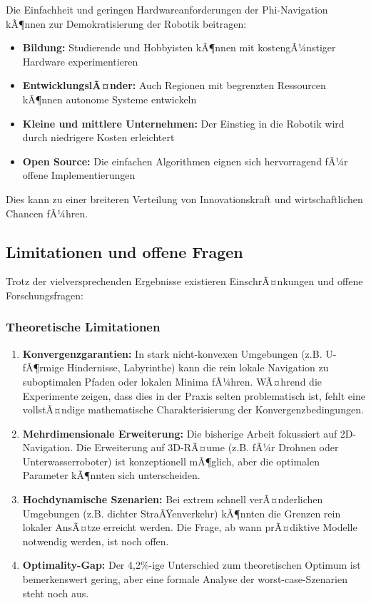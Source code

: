 ﻿\documentclass[a4paper,12pt]{article}
\theoremstyle{definition}
\begin{document}
Die Einfachheit und geringen Hardwareanforderungen der Phi-Navigation kÃ¶nnen zur Demokratisierung der Robotik beitragen:

\begin{itemize}
	\item \textbf{Bildung:} Studierende und Hobbyisten kÃ¶nnen mit kostengÃ¼nstiger Hardware experimentieren
	\item \textbf{EntwicklungslÃ¤nder:} Auch Regionen mit begrenzten Ressourcen kÃ¶nnen autonome Systeme entwickeln
	\item \textbf{Kleine und mittlere Unternehmen:} Der Einstieg in die Robotik wird durch niedrigere Kosten erleichtert
	\item \textbf{Open Source:} Die einfachen Algorithmen eignen sich hervorragend fÃ¼r offene Implementierungen
\end{itemize}

Dies kann zu einer breiteren Verteilung von Innovationskraft und wirtschaftlichen Chancen fÃ¼hren.

\subsection{Limitationen und offene Fragen}

Trotz der vielversprechenden Ergebnisse existieren EinschrÃ¤nkungen und offene Forschungsfragen:

\subsubsection{Theoretische Limitationen}

\begin{enumerate}
	\item \textbf{Konvergenzgarantien:} In stark nicht-konvexen Umgebungen (z.B. U-fÃ¶rmige Hindernisse, Labyrinthe) kann die rein lokale Navigation zu suboptimalen Pfaden oder lokalen Minima fÃ¼hren. WÃ¤hrend die Experimente zeigen, dass dies in der Praxis selten problematisch ist, fehlt eine vollstÃ¤ndige mathematische Charakterisierung der Konvergenzbedingungen.
	
	\item \textbf{Mehrdimensionale Erweiterung:} Die bisherige Arbeit fokussiert auf 2D-Navi\-gation. Die Erweiterung auf 3D-RÃ¤ume (z.B. fÃ¼r Drohnen oder Unterwasserroboter) ist konzeptionell mÃ¶glich, aber die optimalen Parameter kÃ¶nnten sich unterscheiden.
	
	\item \textbf{Hochdynamische Szenarien:} Bei extrem schnell verÃ¤nderlichen Umgebungen (z.B. dichter StraÃŸenverkehr) kÃ¶nnten die Grenzen rein lokaler AnsÃ¤tze erreicht werden. Die Frage, ab wann prÃ¤diktive Modelle notwendig werden, ist noch offen.
	
	\item \textbf{Optimality-Gap:} Der 4{,}2\%-ige Unterschied zum theoretischen Optimum ist bemerkenswert gering, aber eine formale Analyse der worst-case-Szenarien steht noch aus.
\end{enumerate}
\end{document}
